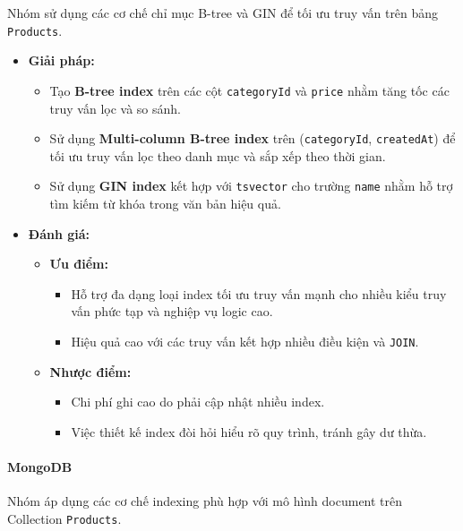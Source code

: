 Nhóm sử dụng các cơ chế chỉ mục B-tree và GIN để tối ưu truy vấn trên bảng \texttt{Products}.

\begin{itemize}[label=$\circ$]
    \item \textbf{Giải pháp:}
    \begin{itemize}[label=$\bullet$]
        \item Tạo \textbf{B-tree index} trên các cột \texttt{categoryId} và \texttt{price} nhằm tăng tốc các truy vấn lọc và so sánh.
        \item Sử dụng \textbf{Multi-column B-tree index} trên (\texttt{categoryId}, \texttt{createdAt}) để tối ưu truy vấn lọc theo danh mục và sắp xếp theo thời gian.
        \item Sử dụng \textbf{GIN index} kết hợp với \texttt{tsvector} cho trường \texttt{name} nhằm hỗ trợ tìm kiếm từ khóa trong văn bản hiệu quả.
    \end{itemize}
    
    \item \textbf{Đánh giá:}
    \begin{itemize}[label=$\bullet$]
        \item \textbf{Ưu điểm:}
        \begin{itemize}
            \item Hỗ trợ đa dạng loại index tối ưu truy vấn mạnh cho nhiều kiểu truy vấn phức tạp và nghiệp vụ logic cao.
            \item Hiệu quả cao với các truy vấn kết hợp nhiều điều kiện và \texttt{JOIN}.
        \end{itemize}
        
        \item \textbf{Nhược điểm:}
        \begin{itemize}
            \item Chi phí ghi cao do phải cập nhật nhiều index.
            \item Việc thiết kế index đòi hỏi hiểu rõ quy trình, tránh gây dư thừa.
        \end{itemize}
    \end{itemize}
\end{itemize}

\paragraph{MongoDB}
Nhóm áp dụng các cơ chế indexing phù hợp với mô hình document trên Collection \texttt{Products}.

